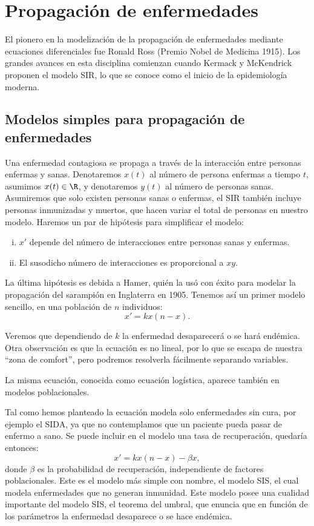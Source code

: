 \documentclass[../main.tex]{subfiles}
\begin{document}
\section{Propagación de enfermedades}

El pionero en la modelización de la propagación de enfermedades mediante
ecuaciones diferenciales fue Ronald Ross (Premio Nobel de Medicina 1915). Los
grandes avances en esta disciplina comienzan cuando Kermack y McKendrick
proponen el modelo SIR, lo que se conoce como el inicio de la epidemiología
moderna.

\subsection{Modelos simples para propagación de enfermedades}

Una enfermedad contagiosa se propaga a través de la interacción entre personas
enfermas y sanas. Denotaremos \(x(t)\) al número de persona enfermas a tiempo
\(t\), asumimos \(x(t) \in \R\), y denotaremos \(y(t)\) al número de personas
sanas. Asumiremos que solo existen personas sanas o enfermas, el SIR también
incluye personas inmunizadas y muertos, que hacen variar el total de personas en
nuestro modelo. Haremos un par de hipótesis para simplificar el modelo:
\begin{enumerate}[i)]
	\item \(x'\) depende del número de interacciones entre personas sanas y
		enfermas.

	\item El susodicho número de interacciones es proporcional a \(xy\).
\end{enumerate}

La última hipótesis es debida a Hamer, quién la usó con éxito para modelar
la propagación del sarampión en Inglaterra en 1905. Tenemos así un primer
modelo sencillo, en una población de \(n\) individuos:
\[x' = k x(n - x).\]

Veremos que dependiendo de \(k\) la enfermedad desaparecerá o se hará endémica.
Otra observación es que la ecuación es no lineal, por lo que se escapa de
nuestra ``zona de comfort'', pero podremos resolverla fácilmente separando
variables.

\begin{remark}
	La misma ecuación, conocida como ecuación logística, aparece también en
	modelos poblacionales.
\end{remark}

Tal como hemos planteado la ecuación modela solo enfermedades sin cura, por
ejemplo el SIDA, ya que no contemplamos que un paciente pueda pasar de enfermo a
sano. Se puede incluir en el modelo una tasa de recuperación, quedaría entonces:
\[x' = k x(n - x) - \beta x,\]
donde \(\beta\) es la probabilidad de recuperación, independiente de factores
poblacionales. Este es el modelo más simple con nombre, el modelo SIS, el cual
modela enfermedades que no generan inmunidad. Este modelo posee una cualidad
importante del modelo SIS, el teorema del umbral, que enuncia que en función de
los parámetros la enfermedad desaparece o se hace endémica.
\end{document}
